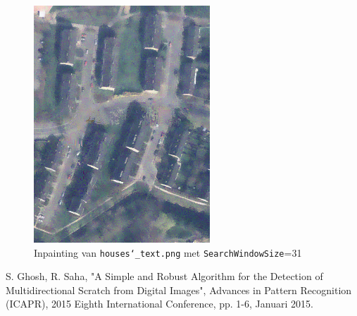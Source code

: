 \documentclass[titlepage]{article}
\begin{document}
\begin{figure}[H]
\begin{minipage}{\textwidth}
    \includegraphics[width=.4\textwidth]{houses_noise_smoothed}
  \end{minipage}
    \caption{Inpainting van \texttt{houses\char`_text.png} met \texttt{SearchWindowSize}=31} \label{fig:houses_text}
\end{figure}

\begin{thebibliography}{1}
  S. Ghosh, R. Saha,
  "A Simple and Robust Algorithm for the Detection of
Multidirectional Scratch from Digital Images",
  Advances in Pattern Recognition (ICAPR), 2015 Eighth International Conference,
  pp. 1-6,
  Januari 2015.
\end{thebibliography}
\end{document}
